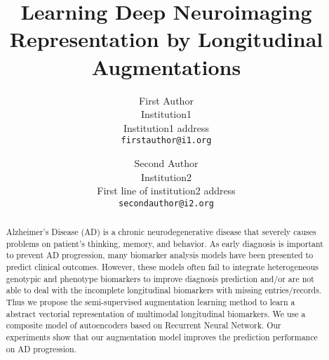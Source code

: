 \documentclass[review]{cvpr}
\begin{document}
\title{Learning Deep Neuroimaging Representation by Longitudinal Augmentations}

\author{First Author\\
Institution1\\
Institution1 address\\
{\tt\small firstauthor@i1.org}
\and
Second Author\\
Institution2\\
First line of institution2 address\\
{\tt\small secondauthor@i2.org}
}

\maketitle


\begin{abstract}
   Alzheimer's Disease (AD) is a chronic neurodegenerative disease that severely causes problems on patient's thinking, memory, and behavior. As early diagnosis is important to prevent AD progression, many biomarker analysis models have been presented to predict clinical outcomes. However, these models often fail to integrate heterogeneous genotypic and phenotype biomarkers to improve diagnosis prediction and/or are not able to deal with the incomplete longitudinal biomarkers with missing entries/records. Thus we propose the semi-supervised augmentation learning method to learn a abstract vectorial representation of multimodal longitudinal biomarkers. We use a composite model of  autoencoders based on Recurrent Neural Network. Our experiments show that our augmentation model improves the prediction performance on AD progression.
\end{abstract}


\end{document}
